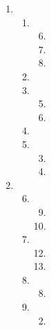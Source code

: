 \documentclass[12pt,letterpaper]{article}
\begin{document}
\begin{enumerate}
\begin{enumerate}
\begin{enumerate}
          \end{enumerate}
      \end{enumerate}
    \item
      \begin{enumerate}
        \item
          \begin{enumerate}
            \setcounter{enumiii}{5}
            \item
            \setcounter{enumiii}{7}
            \item
            \setcounter{enumiii}{9}
            \item
          \end{enumerate}
        \setcounter{enumii}{11}
        \item
        \setcounter{enumii}{14}
        \item
          \begin{enumerate}
            \setcounter{enumiii}{4}
            \item
            \item
          \end{enumerate}
        \item
        \item
          \begin{enumerate}
            \setcounter{enumiii}{2}
            \item
            \item
          \end{enumerate}
      \end{enumerate}
    \item
      \begin{enumerate}
        \setcounter{enumii}{5}
        \item
          \begin{enumerate}
            \setcounter{enumiii}{8}
            \item
            \setcounter{enumiii}{10}
            \item
          \end{enumerate}
        \item
          \begin{enumerate}
            \setcounter{enumiii}{11}
            \item
            \item
          \end{enumerate}
        \item
          \begin{enumerate}
            \setcounter{enumiii}{7}
            \item
          \end{enumerate}
        \setcounter{enumii}{11}
        \item
          \begin{enumerate}
            \setcounter{enumiii}{1}
            \item
          \end{enumerate}
      \end{enumerate}
  \end{enumerate}
\end{document}
